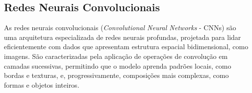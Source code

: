 \documentclass[12pt]{article}
\begin{document}

\subsection{Redes Neurais Convolucionais}
\label{sec:review:cnn}

As redes neurais convolucionais (\emph{Convolutional Neural Networks} - CNNs) são uma arquitetura especializada de redes neurais profundas, projetada para lidar eficientemente com dados que apresentam estrutura espacial bidimensional, como imagens. São caracterizadas pela aplicação de operações de convolução em camadas sucessivas, permitindo que o modelo aprenda padrões locais, como bordas e texturas, e, progressivamente, composições mais complexas, como formas e objetos inteiros.
\end{document}

